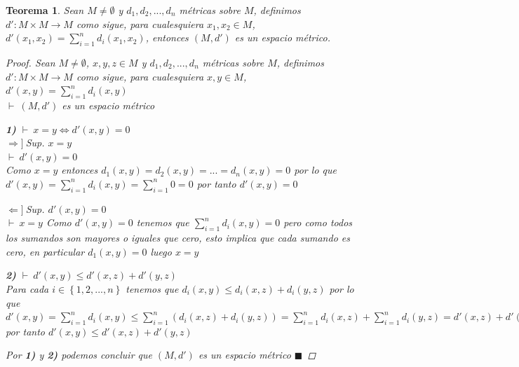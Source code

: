 \documentclass[oneside]{book} %
\theoremstyle{Teorema}
\newtheorem{Teorema}[Definicion]{Teorema}
\theoremstyle{Ejemplos}
\theoremstyle{[Obs]}
\renewcommand{\{}{\left\lbrace} %
\renewcommand{\}}{\right\rbrace} %
\renewcommand{\qed}{$\blacksquare$} %
\newcommand{\pd}{$\vdash\ $} %
\newcommand{\necesidad}{$\Rightarrow]\ $} %
\newcommand{\suficiencia}{$\Leftarrow]\ $} %
\begin{document}
			\begin{Teorema}\setlength{\parindent}{0em}
				
				Sean $M \neq \emptyset$ y $d_1, d_2, ..., d_n$ métricas sobre $M$, definimos $d' : M \times M \to M$ como sigue, para cualesquiera $x_1, x_2 \in M$, $d'(x_1, x_2) = \sum_{i = 1}^{n} d_i(x_1, x_2)$, entonces $(M, d')$ es un espacio métrico. 

				\begin{proof}
					
					Sean $M \neq \emptyset$, $x, y, z \in M$ y $d_1, d_2, ..., d_n$ métricas sobre $M$, definimos $d' : M \times M \to M$ como sigue, para cualesquiera $x, y \in M$, $d'(x, y) = \sum_{i = 1}^{n} d_i(x, y)$ \\
					\pd $(M, d')$ es un espacio métrico

					\textbf{1)} \pd $x = y \Leftrightarrow d'(x, y) = 0$ \\
					\necesidad Sup. $x = y$ \\
					\pd $d'(x, y) = 0$ \\
					Como $x = y$ entonces $d_1(x, y) = d_2(x, y) = ... = d_n(x, y) = 0$ por lo que $d'(x, y) = \sum_{i = 1}^{n} d_i(x, y) = \sum_{i = 1}^{n} 0 = 0$ por tanto $d'(x, y) = 0$

					\suficiencia Sup. $d'(x, y) = 0$ \\
					\pd $x = y$
					Como $d'(x, y) = 0$ tenemos que $\sum_{i = 1}^{n} d_i(x, y) = 0$ pero como todos los sumandos son mayores o iguales que cero, esto implica que cada sumando es cero, en particular $d_1(x, y) = 0$ luego $x = y$

					\textbf{2)} \pd $d'(x, y) \leq d'(x, z) + d'(y, z)$ \\
					Para cada $i \in \{ 1, 2, ..., n \}$ tenemos que $d_i(x, y) \leq d_i(x, z) + d_i(y, z)$ por lo que $d'(x, y) = \sum_{i = 1}^{n} d_i(x, y) \leq \sum_{i = 1}^{n} \left( d_i(x, z) + d_i(y, z) \right) = \sum_{i = 1}^{n} d_i(x, z) + \sum_{i = 1}^{n} d_i(y, z) = d'(x, z) + d'(y, z)$ por tanto $d'(x, y) \leq d'(x, z) + d'(y, z)$

					Por \textbf{1)} y \textbf{2)} podemos concluir que $(M, d')$ es un espacio métrico \qed

				\end{proof}

			\end{Teorema}
\end{document}
